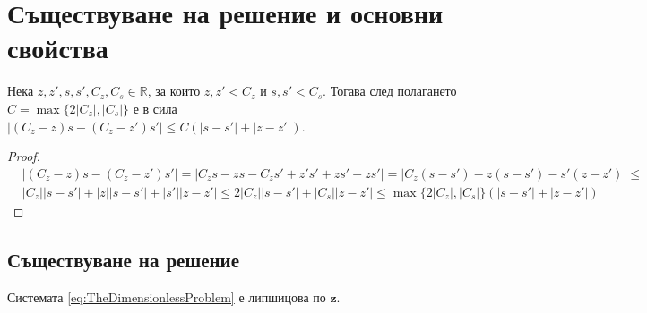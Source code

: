 \section{Съществуване на решение и основни свойства}
\begin{lemma}
  \label{lemma:Modulus}
  Нека $z, z', s, s', C_z, C_s \in \mathbb{R}$, за които $z, z' < C_z$ и $s, s' < C_s$. Тогава след полагането $C = \max\{2 |C_z|, |C_s|\}$ е в сила $|(C_z - z) s - (C_z - z') s'| \leq C (|s-s'| + |z - z'|)$.
\end{lemma}

\begin{proof}
  \begin{equation}
    \begin{split}
      &|(C_z - z) s - (C_z - z') s'| =
      |C_z s - z s - C_z s' + z' s' + z s' - z s'| =
      |C_z (s - s') - z (s - s') - s' (z - z')| \leq \\
      &|C_z| |s - s'| + |z| |s - s'| + |s'| |z - z'| \leq
      2 |C_z| |s - s'|  + |C_s| |z - z'| \leq
      \max\{2 |C_z|, |C_s|\} (|s-s'| + |z - z'|)
    \end{split}
    \end{equation}
    \end{proof}
\subsection{Съществуване на решение}
\begin{proposition}
  \label{prp:LipschitzContinuity}
  Системата \eqref{eq:TheDimensionlessProblem} е липшицова по $\mathbf{z}$.
\end{proposition}

